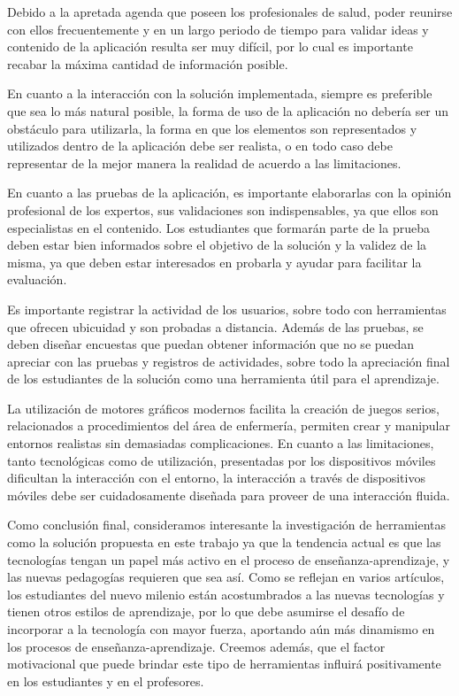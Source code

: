 Debido a la apretada agenda que poseen los profesionales de salud, poder
reunirse con ellos frecuentemente y en un largo periodo de tiempo para validar
ideas y contenido de la aplicación resulta ser muy difícil, por lo cual es
importante recabar la máxima cantidad de información posible.

En cuanto a la interacción con la solución implementada, siempre es preferible
que sea lo más natural posible, la forma de uso de la aplicación no debería ser
un obstáculo para utilizarla, la forma en que los elementos son representados y
utilizados dentro de la aplicación debe ser realista, o en todo caso debe
representar de la mejor manera la realidad de acuerdo a las limitaciones.

En cuanto a las pruebas de la aplicación, es importante elaborarlas con la
opinión profesional de los expertos, sus validaciones son indispensables, ya que
ellos son especialistas en el contenido. Los estudiantes que formarán parte de
la prueba deben estar bien informados sobre el objetivo de la solución y la
validez de la misma, ya que deben estar interesados en probarla y ayudar para
facilitar la evaluación. 

Es importante registrar la actividad de los usuarios, sobre todo con
herramientas que ofrecen ubicuidad y son probadas a distancia. Además de las
pruebas, se deben diseñar encuestas que puedan obtener información que no se
puedan apreciar con las pruebas y registros de actividades, sobre todo la
apreciación final de los estudiantes de la solución como una herramienta útil
para el aprendizaje.


La utilización de motores gráficos modernos facilita la creación de juegos
serios, relacionados a procedimientos del área de enfermería, permiten crear y
manipular entornos realistas sin demasiadas complicaciones. En cuanto a las
limitaciones, tanto tecnológicas como de utilización, presentadas por los
dispositivos móviles dificultan la interacción con el entorno, la interacción a
través de dispositivos móviles debe ser cuidadosamente diseñada para proveer de
una interacción fluida. 

Como conclusión final, consideramos interesante la investigación de herramientas
como la solución propuesta en este trabajo ya que la tendencia actual es que las
tecnologías tengan un papel más activo en el proceso de enseñanza-aprendizaje, y
las nuevas pedagogías requieren que sea así. Como se reflejan en varios
artículos, los estudiantes del nuevo milenio están acostumbrados a las nuevas
tecnologías y tienen otros estilos de aprendizaje, por lo que debe asumirse el
desafío de incorporar a la tecnología con mayor fuerza, aportando aún más
dinamismo en los procesos de enseñanza-aprendizaje. Creemos además, que el
factor motivacional que puede brindar este tipo de herramientas influirá
positivamente en los estudiantes y en el profesores.

